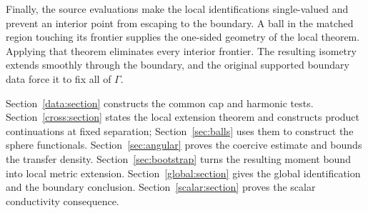 Finally, the source evaluations make the local identifications
single-valued and prevent an interior point from escaping to the
boundary. A ball in the matched region touching its frontier supplies
the one-sided geometry of the local theorem. Applying that theorem
eliminates every interior frontier. The resulting isometry extends
smoothly through the boundary, and the original supported boundary
data force it to fix all of $\Gamma$.

Section~\ref{data:section} constructs the common cap and harmonic tests.
Section~\ref{cross:section} states the local extension theorem and
constructs product continuations at fixed separation;
Section~\ref{sec:balls} uses them to construct the sphere functionals.
Section~\ref{sec:angular} proves the coercive estimate and bounds the
transfer density. Section~\ref{sec:bootstrap} turns the resulting
moment bound into local metric extension.
Section~\ref{global:section} gives the global identification and the
boundary conclusion. Section~\ref{scalar:section} proves the scalar
conductivity consequence.
